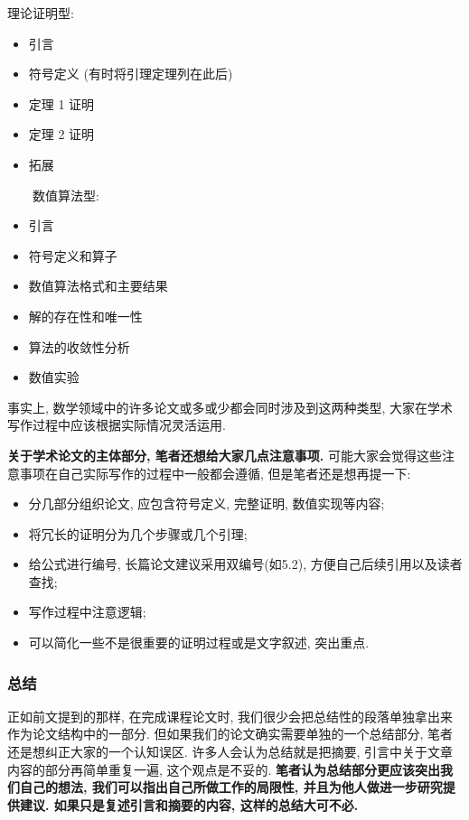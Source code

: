 \documentclass{formatBook}
\begin{document}
\begin{multicols}{2}
    理论证明型:
    \begin{itemize}
        \item 引言
        \item 符号定义 (有时将引理定理列在此后)
        \item 定理 1 证明
        \item 定理 2 证明
        \item 拓展
    \end{itemize}
    \ \ \ \   数值算法型:
    \begin{itemize}
        \item 引言
        \item 符号定义和算子
        \item 数值算法格式和主要结果
        \item 解的存在性和唯一性
        \item 算法的收敛性分析
        \item 数值实验
    \end{itemize}
\end{multicols}
\par 事实上, 数学领域中的许多论文或多或少都会同时涉及到这两种类型, 大家在学术写作过程中应该根据实际情况灵活运用.
\par \textbf{关于学术论文的主体部分, 笔者还想给大家几点注意事项.} 可能大家会觉得这些注意事项在自己实际写作的过程中一般都会遵循, 但是笔者还是想再提一下:
\begin{itemize}
    \item 分几部分组织论文, 应包含符号定义, 完整证明, 数值实现等内容{;}
    \item 将冗长的证明分为几个步骤或几个引理{;}
    \item 给公式进行编号, 长篇论文建议采用双编号(如5.2), 方便自己后续引用以及读者查找{;}
    \item 写作过程中注意逻辑{;}
    \item 可以简化一些不是很重要的证明过程或是文字叙述, 突出重点{.}
\end{itemize}
\subsubsection{总结}
正如前文提到的那样, 在完成课程论文时, 我们很少会把总结性的段落单独拿出来作为论文结构中的一部分. 但如果我们的论文确实需要单独的一个总结部分, 笔者还是想纠正大家的一个认知误区. 许多人会认为总结就是把摘要, 引言中关于文章内容的部分再简单重复一遍, 这个观点是不妥的. \textbf{笔者认为总结部分更应该突出我们自己的想法, 我们可以指出自己所做工作的局限性, 并且为他人做进一步研究提供建议. 如果只是复述引言和摘要的内容, 这样的总结大可不必.}
\end{document}

